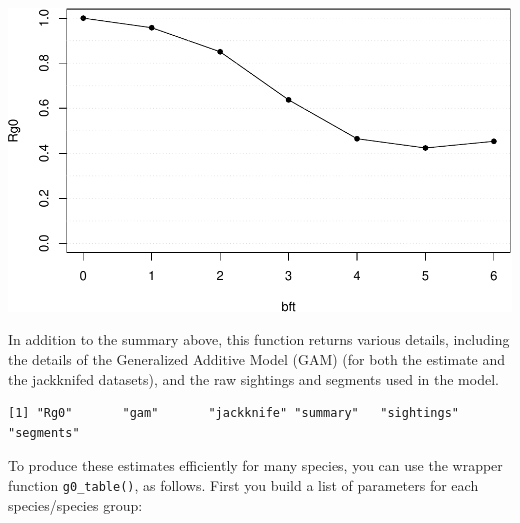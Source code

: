 \documentclass[
]{book}
\newenvironment{Shaded}{\begin{snugshade}}{\end{snugshade}}
\newcommand{\DataTypeTok}[1]{\textcolor[rgb]{0.13,0.29,0.53}{#1}}
\newcommand{\DecValTok}[1]{\textcolor[rgb]{0.00,0.00,0.81}{#1}}
\newcommand{\KeywordTok}[1]{\textcolor[rgb]{0.13,0.29,0.53}{\textbf{#1}}}
\newcommand{\NormalTok}[1]{#1}
\newcommand{\OperatorTok}[1]{\textcolor[rgb]{0.81,0.36,0.00}{\textbf{#1}}}
\newcommand{\StringTok}[1]{\textcolor[rgb]{0.31,0.60,0.02}{#1}}
\begin{document}
\begin{Shaded}
\end{Shaded}

\includegraphics{figures/unnamed-chunk-203-1.pdf}

In addition to the summary above, this function returns various details, including the details of the Generalized Additive Model (GAM) (for both the estimate and the jackknifed datasets), and the raw sightings and segments used in the model.

\begin{verbatim}
[1] "Rg0"       "gam"       "jackknife" "summary"   "sightings" "segments" 
\end{verbatim}

To produce these estimates efficiently for many species, you can use the wrapper function \texttt{g0\_table()}, as follows. First you build a list of parameters for each species/species group:
\end{document}
